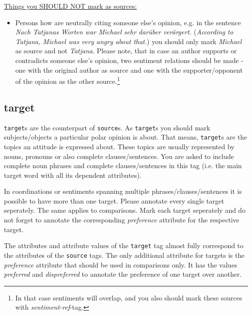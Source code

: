 \documentclass[11pt,a4paper]{article}
\begin{document}
\underline{Things you SHOULD NOT mark as sources:}
\begin{itemize}
  \item Persons how are neutrally citing someone else's opinion,
    e.g. in the sentence \textit{Nach Tatjanas Worten war Michael sehr
      dar\"uber ver\"argert.} (\textit{According to Tatjana, Michael
      was very angry about that.}) you should only mark
    \textit{Michael} as source and not \textit{Tatjana}. Please note, that in case an author
    supports or contradicts someone else's opinion, two sentiment
    relations should be made - one with the original author as source
    and one with the supporter/opponent of the opinion as the other
    source.\footnote{In that case sentiments will overlap, and
      you also should mark these sources with \textit{sentiment-ref}-tag.}
\end{itemize}



\subsection{target}
\texttt{target}s are the counterpart of \texttt{source}s.
As \texttt{target}s you should mark subjects/objects a particular polar
opinion is about. That means, \texttt{target}s are the topics an attitude is expressed about. 
These topics are usually represented
by nouns, pronouns or also complete clauses/sentences.  You are asked to include
complete noun phrases and complete clauses/sentences in this tag (i.e. the main
target word with all its dependent attributes).

In coordinations or sentiments spanning multiple phrases/clauses/sentences it 
is possible to have more than one target. Please annotate every single target seperately. 
The same applies to comparisons. Mark each target seperately and do not forget to annotate 
the corresponding \textit{preference} attribute for the respective target.

The attributes and attribute values of the \texttt{target} tag almost
fully correspond to the attributes of the \texttt{source} tags. The only 
additional attribute for targets is the \textit{preference} attribute that should 
be used in comparisons only. It has the values \textit{preferred} and \textit{dispreferred} to annotate 
the preference of one target over another. \newline
\end{document}
